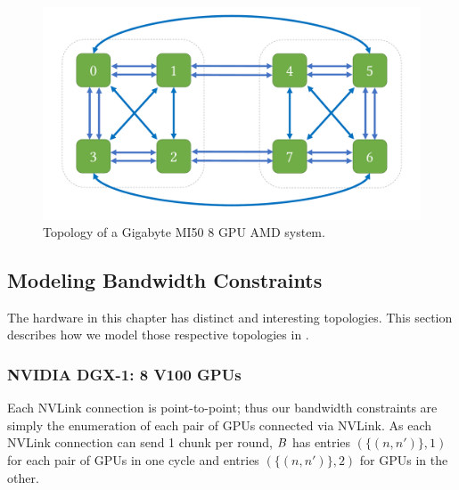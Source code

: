 \begin{figure}[tbp]
  \centering
  \includegraphics[page=2,width=0.8\columnwidth]{figures/topos}
  \caption{Topology of a Gigabyte MI50 8 GPU AMD system.}
  \label{fig:amd-topo}
  \end{figure}

\subsection{Modeling Bandwidth Constraints}
The hardware in this chapter has distinct and interesting topologies.
This section describes how we model those respective topologies in
\tool.

\subsubsection{NVIDIA DGX-1: 8 V100 GPUs}
Each NVLink connection is point-to-point; thus our bandwidth
constraints are simply the enumeration of each pair of GPUs connected
via NVLink. As each NVLink connection can send 1 chunk per round,
$B$ has entries $(\{(n,n')\},1)$ for each pair of GPUs in one cycle
and entries $(\{(n,n')\},2)$ for GPUs in the other.

